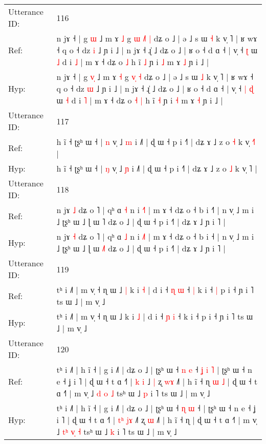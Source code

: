 \documentclass[10pt]{article}
\DeclareRobustCommand{\hl}[1]{{\textcolor{red}{#1}}}
\begin{document}
\begin{longtable}{ll}
 \\
\midrule
Utterance ID: & 116 \\
Ref: & n jɤ ˧ | g \hl{}\hl{ɯ} ˩ m ɤ \hl{˩} g\hl{ }\hl{ɯ} \hl{˩}\hl{˥} \hl{|} dʑ o ˩ | ə ˩ s ɯ \hl{˧} k v̩ ˥ | ʁ wɤ ˧ q o ˧ dz \hl{i} ˩ ɲ i ˩ | n jɤ ˧ ɻ̍ ˩ dʑ o ˩ | ʁ o ˧ d ɑ ˧ | v̩ ˧\hl{}\hl{} \hl{ʈ} ɯ \hl{˩} d i \hl{˩} | m ɤ ˧ dʑ o\hl{}\hl{} \hl{˩} h ĩ \hl{˩} ɲ i \hl{˩} m ɤ \hl{˩} ɲ i ˩ |
 \\
Hyp: & n jɤ ˧ | g \hl{v}\hl{̩} ˩ m ɤ \hl{˧} g\hl{}\hl{} \hl{v}\hl{̩} \hl{˧} dʑ o ˩ | ə ˩ s ɯ \hl{˩} k v̩ ˥ | ʁ wɤ ˧ q o ˧ dz \hl{ɯ} ˩ ɲ i ˩ | n jɤ ˧ ɻ̍ ˩ dʑ o ˩ | ʁ o ˧ d ɑ ˧ | v̩ ˧\hl{ }\hl{|} \hl{ɖ} ɯ \hl{˧} d i \hl{˥} | m ɤ ˧ dʑ o\hl{ }\hl{˧} \hl{|} h ĩ \hl{˧} ɲ i \hl{˧} m ɤ \hl{˧} ɲ i ˩ |
 \\
\midrule
Utterance ID: & 117 \\
Ref: & h ĩ ˧ ʈʂʰ ɯ ˧ | \hl{n} v̩ ˩ \hl{m} i ˩˥ | ɖ ɯ ˧ p i ˧˥ | dʑ ɤ ˩ z o \hl{˧} k v̩ \hl{˧}˥ |
 \\
Hyp: & h ĩ ˧ ʈʂʰ ɯ ˧ | \hl{ŋ} v̩ ˩ \hl{ɲ} i ˩˥ | ɖ ɯ ˧ p i ˧˥ | dʑ ɤ ˩ z o \hl{˩} k v̩ \hl{}˥ |
 \\
\midrule
Utterance ID: & 118 \\
Ref: & n jɤ \hl{˩} dʑ o ˥ | qʰ ɑ \hl{˧} n i \hl{˧}˥ | m ɤ ˧ dʑ o ˧ b i ˧\hl{˥} | n v̩ ˩ m i ˩ ʈʂʰ ɯ ˩ ɭ ɯ \hl{}˥ dʑ o ˩ | ɖ ɯ ˧ p i ˧˥ | dʑ ɤ ˩ ɲ i ˥ |
 \\
Hyp: & n jɤ \hl{˧} dʑ o ˥ | qʰ ɑ \hl{˩} n i \hl{˩}˥ | m ɤ ˧ dʑ o ˧ b i ˧\hl{} | n v̩ ˩ m i ˩ ʈʂʰ ɯ ˩ ɭ ɯ \hl{˩}˥ dʑ o ˩ | ɖ ɯ ˧ p i ˧˥ | dʑ ɤ ˩ ɲ i ˥ |
 \\
\midrule
Utterance ID: & 119 \\
Ref: & tʰ i ˩˥ | m v̩ ˧ ɳ ɯ ˩\hl{ }\hl{|} k i \hl{˧} | d i ˧ \hl{ɳ} \hl{ɯ} ˧\hl{ }\hl{|} k i ˧\hl{ }\hl{|} p i ˧ ɲ i ˥ ts ɯ ˩ | m v̩ ˩
 \\
Hyp: & tʰ i ˩˥ | m v̩ ˧ ɳ ɯ ˩\hl{}\hl{} k i \hl{˩} | d i ˧ \hl{ɲ} \hl{i} ˧\hl{}\hl{} k i ˧\hl{}\hl{} p i ˧ ɲ i ˥ ts ɯ ˩ | m v̩ ˩
 \\
\midrule
Utterance ID: & 120 \\
Ref: & tʰ i ˩˥ | h ĩ ˧ | g i ˩˥ | dʑ o ˩ | ʈʂʰ ɯ ˧ \hl{n} \hl{e} ˧\hl{ }\hl{ʝ}\hl{ }\hl{i}\hl{ }\hl{˥} | ʈʂʰ ɯ ˧ n e ˧ ʝ i ˥ | ɖ ɯ ˧ t ɑ ˧˥ | \hl{}\hl{k} \hl{}\hl{i} ˩\hl{ }\hl{|} ʐ \hl{w}\hl{ɤ} ˩˥ | h ĩ ˧ ɳ\hl{ }\hl{ɯ}\hl{ }\hl{˩} | ɖ ɯ ˧ t ɑ ˧˥ | m v̩ ˩ \hl{}\hl{d} \hl{}\hl{o} \hl{˩} tsʰ ɯ ˩ \hl{p} i ˥ ts ɯ ˩ | m v̩ ˩
 \\
Hyp: & tʰ i ˩˥ | h ĩ ˧ | g i ˩˥ | dʑ o ˩ | ʈʂʰ ɯ ˧ \hl{ɳ} \hl{ɯ} ˧\hl{}\hl{}\hl{}\hl{}\hl{}\hl{} | ʈʂʰ ɯ ˧ n e ˧ ʝ i ˥ | ɖ ɯ ˧ t ɑ ˧˥ | \hl{t}\hl{ʰ} \hl{j}\hl{ɤ} ˩\hl{}\hl{˥} ʐ \hl{}\hl{ɯ} ˩˥ | h ĩ ˧ ɳ\hl{}\hl{}\hl{}\hl{} | ɖ ɯ ˧ t ɑ ˧˥ | m v̩ ˩ \hl{t}\hl{ʰ} \hl{v}\hl{̩} \hl{˧} tsʰ ɯ ˩ \hl{k} i ˥ ts ɯ ˩ | m v̩ ˩

\end{longtable}
\end{document}
